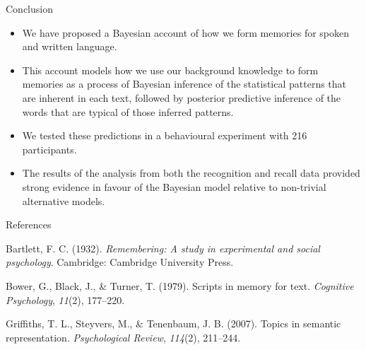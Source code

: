 \documentclass[10pt,ignorenonframetext,]{beamer}
\providecommand{\tightlist}{%
  \setlength{\itemsep}{0pt}\setlength{\parskip}{0pt}}
\begin{document}
\begin{frame}{Conclusion}
\protect\hypertarget{conclusion}{}

\begin{itemize}
\tightlist
\item
  We have proposed a Bayesian account of how we form memories for spoken
  and written language.
\item
  This account models how we use our background knowledge to form
  memories as a process of Bayesian inference of the statistical
  patterns that are inherent in each text, followed by posterior
  predictive inference of the words that are typical of those inferred
  patterns.
\item
  We tested these predictions in a behavioural experiment with 216
  participants.
\item
  The results of the analysis from both the recognition and recall data
  provided strong evidence in favour of the Bayesian model relative to
  non-trivial alternative models.
\end{itemize}

\end{frame}

\begin{frame}{References}
\protect\hypertarget{references}{}

\hypertarget{refs}{}
\leavevmode\hypertarget{ref-bartlett:remembering}{}%
Bartlett, F. C. (1932). \emph{Remembering: A study in experimental and
social psychology}. Cambridge: Cambridge University Press.

\leavevmode\hypertarget{ref-bower:scripts}{}%
Bower, G., Black, J., \& Turner, T. (1979). Scripts in memory for text.
\emph{Cognitive Psychology}, \emph{11}(2), 177--220.

\leavevmode\hypertarget{ref-griffiths:psychrev}{}%
Griffiths, T. L., Steyvers, M., \& Tenenbaum, J. B. (2007). Topics in
semantic representation. \emph{Psychological Review}, \emph{114}(2),
211--244.

\end{frame}
\end{document}
